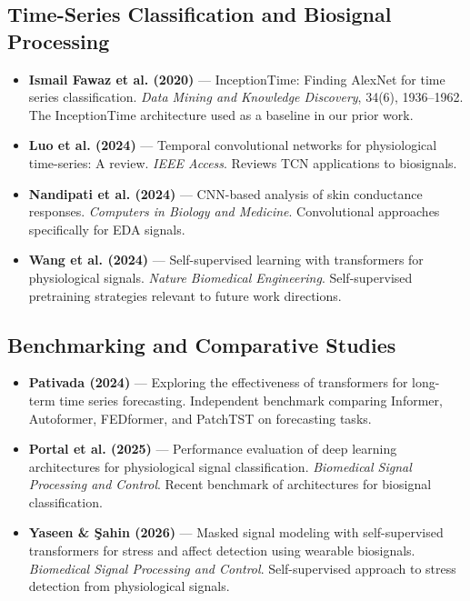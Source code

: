 \documentclass[runningheads]{llncs}
\begin{document}
\subsection*{Time-Series Classification and Biosignal Processing}
\begin{itemize}
    \item \textbf{Ismail Fawaz et al. (2020)} — InceptionTime: Finding AlexNet for time series classification. \textit{Data Mining and Knowledge Discovery}, 34(6), 1936--1962. The InceptionTime architecture used as a baseline in our prior work.
    \item \textbf{Luo et al. (2024)} — Temporal convolutional networks for physiological time-series: A review. \textit{IEEE Access}. Reviews TCN applications to biosignals.
    \item \textbf{Nandipati et al. (2024)} — CNN-based analysis of skin conductance responses. \textit{Computers in Biology and Medicine}. Convolutional approaches specifically for EDA signals.
    \item \textbf{Wang et al. (2024)} — Self-supervised learning with transformers for physiological signals. \textit{Nature Biomedical Engineering}. Self-supervised pretraining strategies relevant to future work directions.
\end{itemize}

\subsection*{Benchmarking and Comparative Studies}
\begin{itemize}
    \item \textbf{Pativada (2024)} — Exploring the effectiveness of transformers for long-term time series forecasting. Independent benchmark comparing Informer, Autoformer, FEDformer, and PatchTST on forecasting tasks.
    \item \textbf{Portal et al. (2025)} — Performance evaluation of deep learning architectures for physiological signal classification. \textit{Biomedical Signal Processing and Control}. Recent benchmark of architectures for biosignal classification.
    \item \textbf{Yaseen \& \c{S}ahin (2026)} — Masked signal modeling with self-supervised transformers for stress and affect detection using wearable biosignals. \textit{Biomedical Signal Processing and Control}. Self-supervised approach to stress detection from physiological signals.
\end{itemize}
\end{document}
